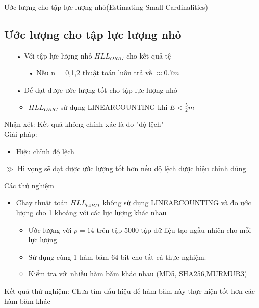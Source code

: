 \documentclass{beamer}
\newcommand{\bi}{\begin{itemize}}
\newcommand{\ei}{\end{itemize}}
\begin{document}
\begin{frame}{Ước lượng cho tập lực lượng nhỏ(Estimating Small Cardinalities)}
\subsection{Ước lượng cho tập lực lượng nhỏ}
\begin{itemize}
\item[•] Với tập lực lượng nhỏ $HLL_{ORIG}$ cho kết quả tệ
\begin{itemize}
\item[•] Nếu n = 0,1,2 thuật toán luôn trả về $\approx 0.7m$ 
\end{itemize}
\item[•] Để đạt được ước lượng tốt cho tập lực lượng nhỏ
\begin{itemize}
\item $HLL_{ORIG}$ sử dụng LINEARCOUNTING khi $E < \frac{5}{2}m$
\end{itemize}
\end{itemize}
{\color{hilight} Nhận xét:} Kết quả không chính xác là do "độ lệch"\\
{\color{hilight} Giải pháp:}
\begin{itemize}
\item Hiệu chỉnh độ lệch
\end{itemize}
 $ \gg $ Hi vọng sẽ đạt được ước lượng tốt hơn nếu độ lệch được hiệu chỉnh đúng


\end{frame}
\begin{frame}{Các thử nghiệm}
\bi
\item Chay thuật toán $HLL_{64BIT}$ không sử dụng LINEARCOUNTING và đo ước lượng cho 1 khoảng với các lực lượng khác nhau
\bi
\item Ước lượng với $p = 14$ trên tập 5000 tập dữ liệu tạo ngẫu nhiên cho mỗi lực lượng
\item Sử dụng cùng 1 hàm băm 64 bit cho tất cả thực nghiệm.
\item Kiểm tra với nhiều hàm băm khác nhau (MD5, SHA256,MURMUR3)
\ei

\ei
{\color{hilight} Kết quả thử nghiệm:}  Chưa tìm dấu hiệu để hàm băm này thực hiện tốt hơn các hàm băm khác
\end{frame}
\end{document}
